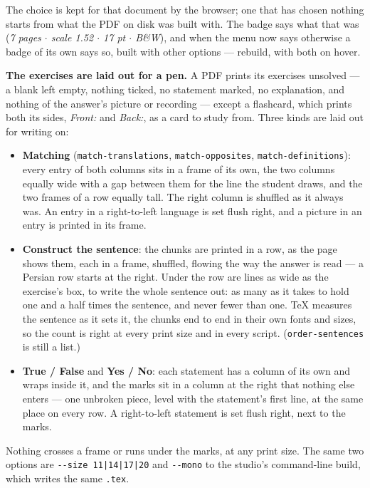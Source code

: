 \documentclass[11pt,oneside]{report}
\newcommand{\file}[1]{\texttt{#1}}
\newcommand{\menu}[1]{\textsf{#1}}
\begin{document}
\noindent The choice is kept for that document by the browser; one that has
chosen nothing starts from what the PDF on disk was built with. The badge
says what that was (\emph{7 pages $\cdot$ scale 1.52 $\cdot$ 17 pt $\cdot$
B\&W}), and when the menu now says otherwise a badge of its own says so,
\menu{built with other options --- rebuild}, with both on hover.

\textbf{The exercises are laid out for a pen.} A PDF prints its exercises
unsolved --- a blank left empty, nothing ticked, no statement marked, no
explanation, and nothing of the answer's picture or recording --- except a
flashcard, which prints both its sides, \emph{Front:} and \emph{Back:}, as a
card to study from. Three kinds are laid out for writing on:

\begin{itemize}
\item \textbf{Matching} (\texttt{match-translations}, \texttt{match-opposites},
  \texttt{match-definitions}): every entry of both columns sits in a frame of
  its own, the two columns equally wide with a gap between them for the line
  the student draws, and the two frames of a row equally tall. The right
  column is shuffled as it always was. An entry in a right-to-left language
  is set flush right, and a picture in an entry is printed in its frame.
\item \textbf{Construct the sentence}: the chunks are printed in a row, as the
  page shows them, each in a frame, shuffled, flowing the way the answer is
  read --- a Persian row starts at the right. Under the row are lines as wide
  as the exercise's box, to write the whole sentence out: as many as it takes
  to hold one and a half times the sentence, and never fewer than one. \TeX{}
  measures the sentence as it sets it, the chunks end to end in their own
  fonts and sizes, so the count is right at every print size and in every
  script. (\texttt{order-sentences} is still a list.)
\item \textbf{True / False} and \textbf{Yes / No}: each statement has a column
  of its own and wraps inside it, and the marks sit in a column at the right
  that nothing else enters --- one unbroken piece, level with the statement's
  first line, at the same place on every row. A right-to-left statement is set
  flush right, next to the marks.
\end{itemize}

\noindent Nothing crosses a frame or runs under the marks, at any print size.
The same two options are \texttt{-{}-size 11|14|17|20} and \texttt{-{}-mono} to
the studio's command-line build, which writes the same \file{.tex}.
\end{document}
